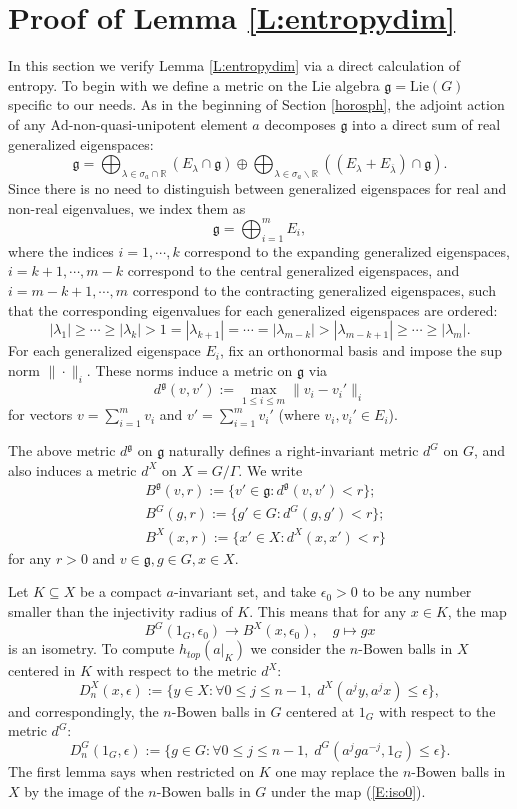 \documentclass[reqno,12pt]{amsart}
\theoremstyle{definition}
\numberwithin{equation}{section}
\newcommand{\RR}{\mathbb{R}}
\newcommand{\Ad}{\mathrm{Ad}}
\newcommand{\Lie}{\mathrm{Lie}}
\newcommand{\Lg}{\mathfrak{g}}
\renewcommand{\setminus}{\smallsetminus}
\begin{document}
{\section{Proof of Lemma \ref{L:entropydim}}\label{A:a}
In this section we verify Lemma \ref{L:entropydim} via a direct calculation of entropy. To begin with we define a {metric on the Lie algebra $\mathfrak{g}=\Lie(G)$ specific} to our needs. As in the beginning of Section \ref{horosph}, the adjoint action of any $\Ad$-non-quasi-unipotent element $a$ decomposes $\mathfrak{g}$ into a direct sum of real generalized eigenspaces: $$
\Lg=\bigoplus_{\lambda\in{\sigma_a}\cap\RR}(E_{\lambda}\cap\Lg)\oplus \bigoplus_{\lambda\in{\sigma_a}\setminus\RR}((E_{\lambda}+E_{\overline{\lambda}})\cap\Lg).
$$
Since there is no need to distinguish between generalized eigenspaces for real and non-real eigenvalues, we index them as $$
\Lg=\bigoplus_{i=1}^mE_i,
$$
where the indices $i=1,\cdots,k$ correspond to the expanding generalized eigenspaces, $i=k+1,\cdots,m-k$ correspond to the central generalized eigenspaces, and $i=m-k+1,\cdots,m$ correspond to the contracting generalized eigenspaces, such that the corresponding eigenvalues for each generalized eigenspaces are ordered: $$
|\lambda_1|\geq\cdots\geq|\lambda_k|>1=|\lambda_{k+1}|=\cdots=|\lambda_{m-k}|>|\lambda_{m-k+1}|\geq\cdots\geq|\lambda_m|.
$$
For each generalized eigenspace $E_i$, fix an orthonormal basis and impose the sup norm $\|\cdot\|_i$. These norms induce a metric on $\Lg$ via
$$d^\Lg(v,v'):=\max_{1\leq i\leq m}\|v_i-v_i'\|_i
$$
for vectors $v=\sum_{i=1}^mv_i$ and $v'=\sum_{i=1}^mv_i'$ (where $v_i,v_i'\in E_i$).

The above metric $d^{\mathfrak{g}}$ on $\Lg$ naturally defines a right-invariant metric $d^G$ on $G$, and also induces a metric $d^X$ on $X=G/\Gamma$. We write \begin{equation*}
    \begin{aligned}
        &B^{\Lg}(v,r):=\{v'\in \Lg:d^\Lg(v,v')<r\};\\
        &B^{G}(g,r):=\{g'\in G:d^G(g,g')<r\};\\
        &B^{X}(x,r):=\{x'\in X:d^X(x,x')<r\}
    \end{aligned}
\end{equation*}
for any $r>0$ and $v\in\Lg,g\in G,x\in X$.

Let $K\subseteq X$ be a compact $a$-invariant set, and take $\epsilon_0>0$ to be any number smaller than the injectivity radius of $K$. This means that for any $x\in K$, the map \begin{equation}\label{E:iso0}
B^G(1_G,\epsilon_0)\to B^X(x,\epsilon_0),\quad g\mapsto gx
\end{equation}
is an isometry. To compute $h_{top}(a|_K)$ we consider the $n$-Bowen balls in $X$ centered in $K$ with respect to the metric $d^X$: $$D^X_n(x,\epsilon):=\{y\in X:\forall 0\leq j\leq n-1,\;d^X(a^jy,a^jx)\leq \epsilon\},$$ and correspondingly, the $n$-Bowen balls in $G$ centered at $1_G$ with respect to the metric $d^G$:
$$D^G_n(1_G,\epsilon):=\{g\in G:\forall 0\leq j\leq n-1,\;d^G(a^jga^{-j},1_G)\leq \epsilon\}.$$
The first lemma says when restricted on $K$ one may replace the $n$-Bowen balls in $X$ by the image of the $n$-Bowen balls in $G$ under the map (\ref{E:iso0}).

}
\end{document}
